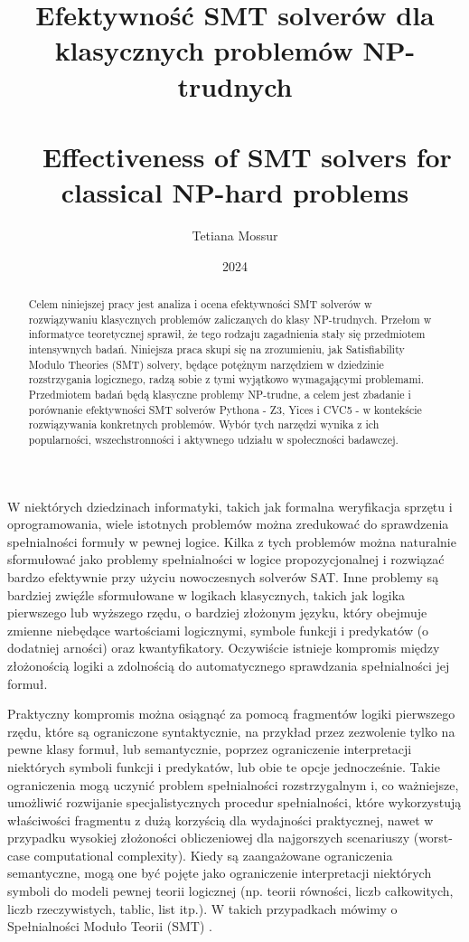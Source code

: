 \documentclass[xodstep]{wnspt}
\author   {Tetiana Mossur}
\date     {2024}
\title{Efektywność SMT solverów dla klasycznych problemów NP-trudnych
\\{~}
\\{~}
Effectiveness of SMT solvers for classical NP-hard problems}
\begin{document}
\begin{abstract}
Celem niniejszej pracy jest analiza i ocena efektywności SMT solverów w rozwiązywaniu klasycznych problemów zaliczanych do klasy NP-trudnych. Przełom w informatyce teoretycznej sprawił, że tego rodzaju zagadnienia stały się przedmiotem intensywnych badań. Niniejsza praca skupi się na zrozumieniu, jak Satisfiability Modulo Theories (SMT) solvery, będące potężnym narzędziem w dziedzinie rozstrzygania logicznego, radzą sobie z tymi wyjątkowo wymagającymi problemami.
Przedmiotem badań będą klasyczne problemy NP-trudne, a celem jest zbadanie i porównanie efektywności SMT solverów Pythona - Z3, Yices i CVC5 - w kontekście rozwiązywania konkretnych problemów. Wybór tych narzędzi wynika z ich popularności, wszechstronności i aktywnego udziału w społeczności badawczej.

\end{abstract}


\maketitle
\onehalfspacing

\introduction
W niektórych dziedzinach informatyki, takich jak formalna weryfikacja sprzętu i oprogramowania, wiele istotnych problemów można zredukować do sprawdzenia spełnialności formuły w pewnej logice. Kilka z tych problemów można naturalnie sformułować jako problemy spełnialności w logice propozycjonalnej i rozwiązać bardzo efektywnie przy użyciu nowoczesnych solverów SAT. Inne problemy są bardziej zwięźle sformułowane w logikach klasycznych, takich jak logika pierwszego lub wyższego rzędu, o bardziej złożonym języku, który obejmuje zmienne niebędące wartościami logicznymi, symbole funkcji i predykatów (o dodatniej arności) oraz kwantyfikatory. Oczywiście istnieje kompromis między złożonością logiki a zdolnością do automatycznego sprawdzania spełnialności jej formuł.

Praktyczny kompromis można osiągnąć za pomocą fragmentów logiki pierwszego rzędu, które są ograniczone syntaktycznie, na przykład przez zezwolenie tylko na pewne klasy formuł, lub semantycznie, poprzez ograniczenie interpretacji niektórych symboli funkcji i predykatów, lub obie te opcje jednocześnie. Takie ograniczenia mogą uczynić problem spełnialności rozstrzygalnym i, co ważniejsze, umożliwić rozwijanie specjalistycznych procedur spełnialności, które wykorzystują właściwości fragmentu z dużą korzyścią dla wydajności praktycznej, nawet w przypadku wysokiej złożoności obliczeniowej dla najgorszych scenariuszy (worst-case computational complexity). Kiedy są zaangażowane ograniczenia semantyczne, mogą one być pojęte jako ograniczenie interpretacji niektórych symboli do modeli pewnej teorii logicznej (np. teorii równości, liczb całkowitych, liczb rzeczywistych, tablic, list itp.). W takich przypadkach mówimy o Spełnialności Moduło Teorii (SMT) \cite{Clarke18}.
\end{document}
